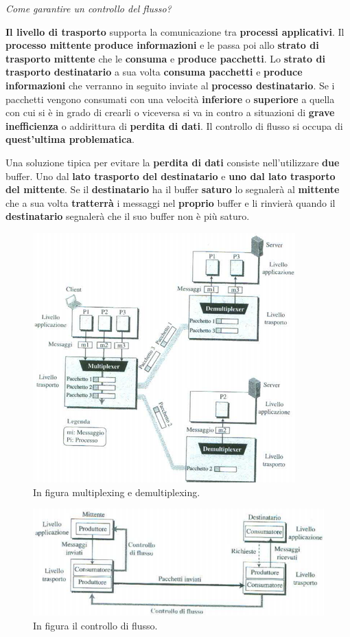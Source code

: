 \documentclass[11pt,a4paper,oneside]{book}
\theoremstyle{definition}
\begin{document}
\begin{flushleft}
	\textit{Come garantire un controllo del flusso?}
\end{flushleft}
\textbf{Il livello di trasporto} supporta la comunicazione tra \textbf{processi applicativi}.  Il \textbf{processo mittente} \textbf{produce informazioni} e le passa poi allo \textbf{strato di trasporto mittente} che le \textbf{consuma} e \textbf{produce pacchetti}. Lo \textbf{strato di trasporto destinatario} a sua volta \textbf{consuma pacchetti} e \textbf{produce informazioni} che verranno in seguito inviate al \textbf{processo destinatario}. Se i pacchetti vengono consumati con una velocità \textbf{inferiore} o \textbf{superiore} a quella con cui si è in grado di crearli o viceversa si va in contro a situazioni di \textbf{grave inefficienza} o addirittura di \textbf{perdita di dati}. Il controllo di flusso si occupa di \textbf{quest'ultima problematica}.

\pagebreak

Una soluzione tipica per evitare la \textbf{perdita di dati} consiste nell'utilizzare \textbf{due} buffer. Uno dal \textbf{lato trasporto  del destinatario} e\textbf{ uno dal lato trasporto del mittente}. Se il \textbf{destinatario} ha il buffer \textbf{saturo} lo segnalerà al \textbf{mittente} che a sua volta \textbf{tratterrà} i messaggi nel \textbf{proprio} buffer e li rinvierà quando il \textbf{destinatario} segnalerà che il suo buffer non è più saturo.
\begin{figure}[!h]
	\includegraphics[scale=0.8]{Immagini/Plexing.png}
	\centering
	\caption{In figura multiplexing e demultiplexing.}
\end{figure}
\begin{figure}[!h]
	\includegraphics[scale=0.6]{Immagini/Flusso_ctr.png}
	\centering
	\caption{In figura il controllo di flusso.}
\end{figure}
\end{document}
